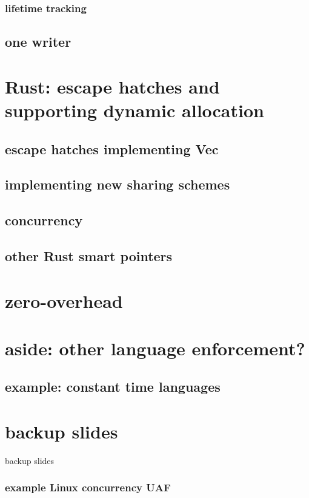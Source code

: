 \subsubsection{lifetime tracking}


\subsection{one writer}


\section{Rust: escape hatches and supporting dynamic allocation}


\subsection{escape hatches implementing Vec}


\subsection{implementing new sharing schemes}


\subsection{concurrency}



\subsection{other Rust smart pointers}


\section{zero-overhead}


\section{aside: other language enforcement?}


\subsection{example: constant time languages}


\section{backup slides}
\begin{frame}{backup slides}
\end{frame}
\subsubsection{example Linux concurrency UAF}



